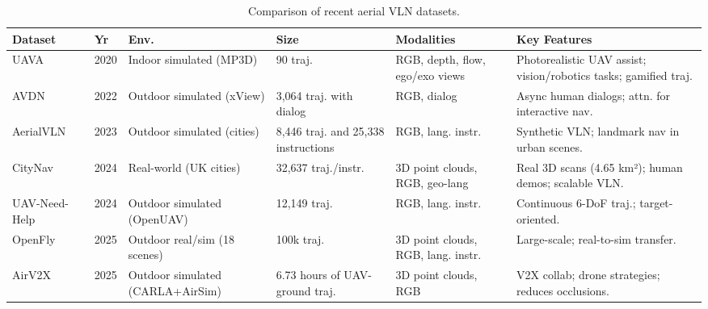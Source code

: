 \begin{table}[!ht]
\small
\centering
\caption{Comparison of recent aerial VLN datasets.}
\label{tab:aerial_datasets}
\begin{tabular}{@{}p{2.5cm}lp{2.5cm}p{2cm}p{3cm}p{3.5cm}@{}}
\toprule
\textbf{Dataset} & \textbf{Yr} & \textbf{Env.} & \textbf{Size} & \textbf{Modalities} & \textbf{Key Features} \\
\midrule
UAVA~\cite{albanis2020dronepose} & 2020 & Indoor simulated (MP3D) & 90 traj. & RGB, depth, flow, ego/exo views & Photorealistic UAV assist; vision/robotics tasks; gamified traj. \\
AVDN~\cite{fan2022aerial} & 2022 & Outdoor simulated (xView) & 3,064 traj. with dialog & RGB, dialog & Async human dialogs; attn. for interactive nav. \\
AerialVLN~\cite{liu2023aerialvln} & 2023 & Outdoor simulated (cities) & 8,446 traj. and 25,338 instructions & RGB, lang. instr. & Synthetic VLN; landmark nav in urban scenes. \\
CityNav~\cite{lee2024citynav} & 2024 & Real-world (UK cities) & 32,637 traj./instr. & 3D point clouds, RGB, geo-lang & Real 3D scans (4.65 km²); human demos; scalable VLN. \\
UAV-Need-Help~\cite{wang2024towards} & 2024 & Outdoor simulated (OpenUAV) & 12,149 traj. & RGB, lang. instr. & Continuous 6-DoF traj.; target-oriented. \\
OpenFly~\cite{gao2025openfly} & 2025 & Outdoor real/sim (18 scenes) & 100k traj. & 3D point clouds, RGB, lang. instr. & Large-scale; real-to-sim transfer. \\
AirV2X~\cite{gao2025airv2x} & 2025 & Outdoor simulated (CARLA+AirSim) & 6.73 hours of UAV-ground traj. & 3D point clouds, RGB & V2X collab; drone strategies; reduces occlusions. \\
\bottomrule
\end{tabular}
\end{table}



